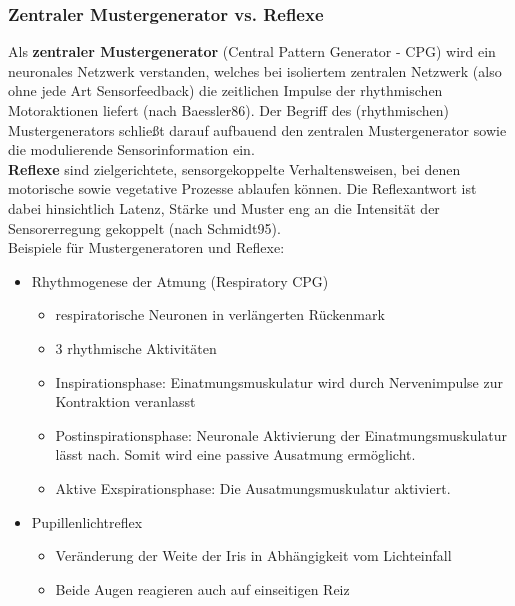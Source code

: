 \subsubsection{Zentraler Mustergenerator vs. Reflexe}
Als \textbf{zentraler Mustergenerator} (Central Pattern Generator - CPG) wird
ein neuronales Netzwerk verstanden, welches bei isoliertem zentralen
Netzwerk (also ohne jede Art Sensorfeedback) die zeitlichen Impulse der
rhythmischen Motoraktionen liefert (nach Baessler86). Der Begriff des
(rhythmischen) Mustergenerators schließt darauf aufbauend den zentralen
Mustergenerator sowie die modulierende Sensorinformation ein.\\
\textbf{Reflexe} sind zielgerichtete, sensorgekoppelte Verhaltensweisen, bei
denen motorische sowie vegetative Prozesse ablaufen können. Die
Reflexantwort ist dabei hinsichtlich Latenz, Stärke und Muster eng an die
Intensität der Sensorerregung gekoppelt (nach Schmidt95).\\ 
Beispiele für Mustergeneratoren und Reflexe:
\begin{itemize}
\item Rhythmogenese der Atmung (Respiratory CPG)
\begin{itemize}
\item respiratorische Neuronen in verlängerten Rückenmark
\item 3 rhythmische Aktivitäten
\item Inspirationsphase: Einatmungsmuskulatur wird durch Nervenimpulse zur Kontraktion veranlasst
\item Postinspirationsphase: Neuronale Aktivierung der Einatmungsmuskulatur lässt nach. Somit wird eine passive Ausatmung ermöglicht.
\item Aktive Exspirationsphase: Die Ausatmungsmuskulatur aktiviert.
\end{itemize}
\item Pupillenlichtreflex 
\begin{itemize}
\item Veränderung der Weite der Iris in Abhängigkeit vom Lichteinfall
\item Beide Augen reagieren auch auf einseitigen Reiz
\end{itemize}
\end{itemize}
